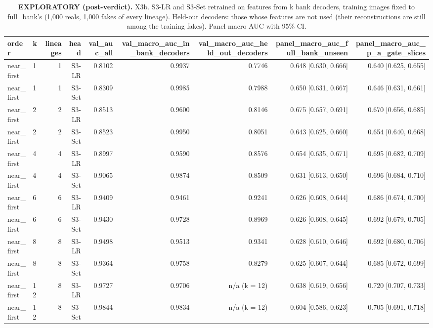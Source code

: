 \begin{table}[htbp]
\centering
\scriptsize
\caption{\textbf{EXPLORATORY (post-verdict).} X3b. S3-LR and S3-Set retrained on features from k bank decoders, training images fixed to full\_bank's (1,000 reals, 1,000 fakes of every lineage). Held-out decoders: those whose features are not used (their reconstructions are still among the training fakes). Panel macro AUC with 95\% CI.}
\label{tab:x3b-decoder-count}
\begin{tabular}{llrrrrrrr}
\toprule
order & k & lineages & head & val\_auc\_all & val\_macro\_auc\_in\_bank\_decoders & val\_macro\_auc\_held\_out\_decoders & panel\_macro\_auc\_full\_bank\_unseen & panel\_macro\_auc\_p\_a\_gate\_slices \\
\midrule
near\_first & 1 & 1 & S3-LR & 0.8102 & 0.9937 & 0.7746 & 0.648 [0.630, 0.666] & 0.640 [0.625, 0.655] \\
near\_first & 1 & 1 & S3-Set & 0.8309 & 0.9985 & 0.7988 & 0.650 [0.631, 0.667] & 0.646 [0.631, 0.661] \\
near\_first & 2 & 2 & S3-LR & 0.8513 & 0.9600 & 0.8146 & 0.675 [0.657, 0.691] & 0.670 [0.656, 0.685] \\
near\_first & 2 & 2 & S3-Set & 0.8523 & 0.9950 & 0.8051 & 0.643 [0.625, 0.660] & 0.654 [0.640, 0.668] \\
near\_first & 4 & 4 & S3-LR & 0.8997 & 0.9590 & 0.8576 & 0.654 [0.635, 0.671] & 0.695 [0.682, 0.709] \\
near\_first & 4 & 4 & S3-Set & 0.9065 & 0.9874 & 0.8509 & 0.631 [0.613, 0.650] & 0.696 [0.684, 0.710] \\
near\_first & 6 & 6 & S3-LR & 0.9409 & 0.9461 & 0.9241 & 0.626 [0.608, 0.644] & 0.686 [0.674, 0.700] \\
near\_first & 6 & 6 & S3-Set & 0.9430 & 0.9728 & 0.8969 & 0.626 [0.608, 0.645] & 0.692 [0.679, 0.705] \\
near\_first & 8 & 8 & S3-LR & 0.9498 & 0.9513 & 0.9341 & 0.628 [0.610, 0.646] & 0.692 [0.680, 0.706] \\
near\_first & 8 & 8 & S3-Set & 0.9364 & 0.9758 & 0.8279 & 0.625 [0.607, 0.644] & 0.685 [0.672, 0.699] \\
near\_first & 12 & 8 & S3-LR & 0.9727 & 0.9706 & n/a (k = 12) & 0.638 [0.619, 0.656] & 0.720 [0.707, 0.733] \\
near\_first & 12 & 8 & S3-Set & 0.9844 & 0.9834 & n/a (k = 12) & 0.604 [0.586, 0.623] & 0.705 [0.691, 0.718] \\

\end{tabular}
\end{table}
